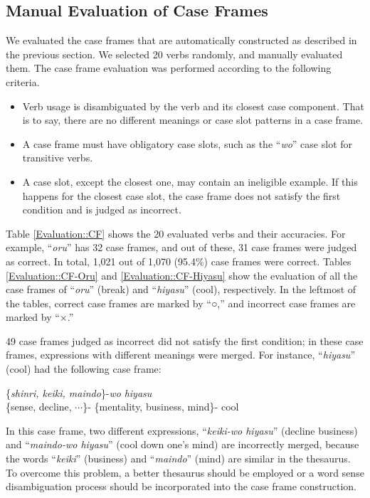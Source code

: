 \documentclass[english]{jnlp_1.4_rep}
\newcommand{\nom}{}
\newcommand{\acc}{}
\begin{document}
\subsection{Manual Evaluation of Case Frames}
\label{Section::ManualCaseFrameEvaluation}

We evaluated the case frames that are automatically constructed as
described in the previous section. We selected 20 verbs randomly, and
manually evaluated them. The case frame evaluation was performed
according to the following criteria.

\begin{itemize}
 \item Verb usage is disambiguated by the verb and its closest case
       component. That is to say, there are no different meanings or
       case slot patterns in a case frame.
 \item A case frame must have obligatory case slots, such
       as the ``\textit{wo}'' case slot for transitive verbs.
 \item A case slot, except the closest one, may contain an ineligible
       example. If this happens for the closest case slot, the case
       frame does not satisfy the first condition and is judged as incorrect.
\end{itemize}

Table \ref{Evaluation::CF} shows the 20 evaluated verbs and their
accuracies.  For example, ``\textit{oru}'' has 32 case frames, and out
of these, 31 case frames were judged as correct. In total, 1,021 out of 1,070
(95.4\%) case frames were correct. Tables \ref{Evaluation::CF-Oru} and
\ref{Evaluation::CF-Hiyasu} show the evaluation of all the case
frames of ``\textit{oru}'' (break) and ``\textit{hiyasu}'' (cool),
respectively. In the leftmost of the tables, correct case frames are
marked by ``○,'' and incorrect case frames are marked by ``×.''

49 case frames judged as incorrect did not satisfy the first condition; 
in these case frames, expressions with different meanings were merged. 
For instance, ``\textit{hiyasu}'' (cool) had the following case
frame:
\begin{exe}
\ex
  {\{\textit{shinri, keiki, maindo}\}-\textit{wo}} \textit{hiyasu} \\
      {\{sense, decline, $\cdots$\}-\nom} {\{mentality, business, mind\}-\acc} cool \\
\end{exe}
In this case frame, two different expressions, ``\textit{keiki-wo
hiyasu}'' (decline business) and ``\textit{maindo-wo hiyasu}'' (cool
down one's mind) are incorrectly merged, because the words
``\textit{keiki}'' (business) and ``\textit{maindo}'' (mind) are similar
in the thesaurus. To overcome this problem, a better thesaurus should be
employed or a word sense disambiguation process should be incorporated
into the case frame construction.
\end{document}
